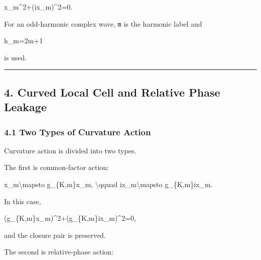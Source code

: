 \documentclass[
  a4paper,
]{article}
\newenvironment{Shaded}{}{}
\newcommand{\NormalTok}[1]{#1}
\begin{document}
\begin{Shaded}
\begin{Highlighting}[]
\NormalTok{x\_m\^{}2+(ix\_m)\^{}2=0.}
\end{Highlighting}
\end{Shaded}

For an odd-harmonic complex wave, \texttt{m} is the harmonic label and

\begin{Shaded}
\begin{Highlighting}[]
\NormalTok{h\_m=2m+1}
\end{Highlighting}
\end{Shaded}

is used.

\begin{center}\rule{0.5\linewidth}{0.5pt}\end{center}

\subsection{4. Curved Local Cell and Relative Phase
Leakage}\label{curved-local-cell-and-relative-phase-leakage}

\subsubsection{4.1 Two Types of Curvature
Action}\label{two-types-of-curvature-action}

Curvature action is divided into two types.

The first is common-factor action:

\begin{Shaded}
\begin{Highlighting}[]
\NormalTok{x\_m\textbackslash{}mapsto g\_\{K,m\}x\_m,}
\NormalTok{\textbackslash{}qquad}
\NormalTok{ix\_m\textbackslash{}mapsto g\_\{K,m\}ix\_m.}
\end{Highlighting}
\end{Shaded}

In this case,

\begin{Shaded}
\begin{Highlighting}[]
\NormalTok{(g\_\{K,m\}x\_m)\^{}2+(g\_\{K,m\}ix\_m)\^{}2=0,}
\end{Highlighting}
\end{Shaded}

and the closure pair is preserved.

The second is relative-phase action:
\end{document}
